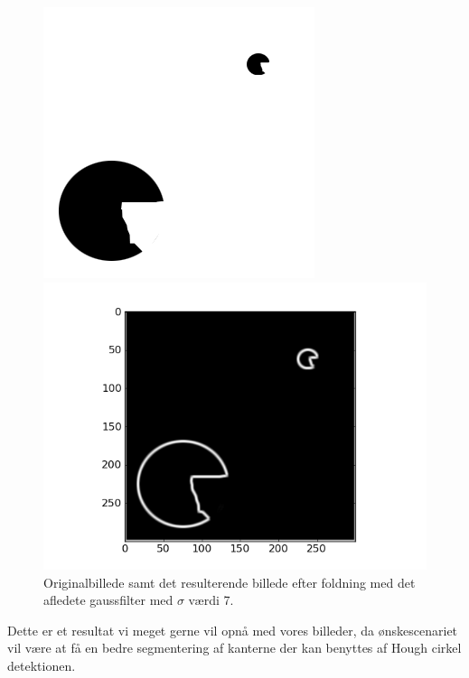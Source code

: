 \begin{figure}[H]
	\begin{minipage}[b]{0.5\linewidth}
		\centering
		\includegraphics[scale=1.3]{files/premethod/img/gauss_derived_circ1.png}
	\end{minipage}
	\hspace{0.5cm}
	\begin{minipage}[b]{0.5\linewidth}
		\centering
		\includegraphics[scale=0.5]{files/premethod/img/gauss_derived_circ2.png}
	\end{minipage}
	\caption{Originalbillede samt det resulterende billede efter foldning med det afledete gaussfilter med $\sigma$ værdi 7.\label{fig:premethod_gaussCirc}}
\end{figure}

Dette er et resultat vi meget gerne vil opnå med vores billeder, da ønskescenariet vil være at få en bedre segmentering af kanterne der kan benyttes af Hough cirkel detektionen.

